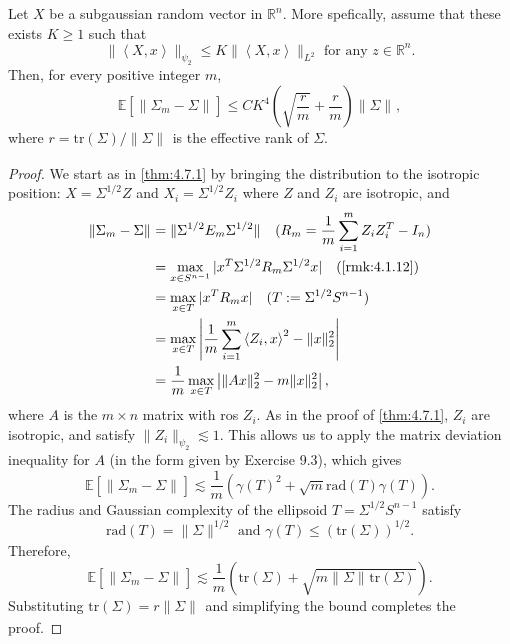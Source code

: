 \begin{theorem}
\label{thm:9.2.2}
Let $X$ be a subgaussian random vector in $\mathbb{R}^n$. More spefically, assume that these exists $K \geq 1$ 
such that 
\[ \lVert \left\langle X, x \right\rangle \rVert_{\psi_2} \leq K \lVert \left\langle X, x 
\right\rangle \rVert_{L^2} \text{ for any } z \in \mathbb{R}^n. \]
Then, for every positive integer $m$, 
\[ \mathbb{E}\left[ \lVert \Sigma_m - \Sigma \rVert_{} \right] \leq CK^4 \left( 
\sqrt{\frac{r}{m}} + \frac{r}{m} \right) \lVert \Sigma \rVert_{}, \]
where $r = \mathrm{tr}(\Sigma)/\lVert \Sigma \rVert_{}$ is the effective rank of $\Sigma$.
\end{theorem}

\begin{proof}
We start as in \cref{thm:4.7.1} by bringing the distribution to the isotropic position: $X = \Sigma^{1/2}Z$ and 
$X_i = \Sigma^{1/2}Z_i$ where $Z$ and $Z_i$ are isotropic, and 
\begin{align*}
	\lVert \Sigma_m - \Sigma \rVert_{} 
	&= \lVert \Sigma^{1/2} E_m \Sigma^{1/2} \rVert_{} \quad (R_m = \frac{1}{m}\sum_{i = 1}^{m}Z_iZ_i^T - I_n) \\
	&= \max_{x \in S^{n-1}} |x^T \Sigma^{1/2} R_m \Sigma^{1/2} x| \quad \text{(\cref{rmk:4.1.12})} \\
	&= \max_{x \in T}|x^T R_m x| \quad (T := \Sigma^{1/2}S^{n-1}) \\
	&= \max_{x \in T} \left| \frac{1}{m}\sum_{i = 1}^{m}\left\langle Z_i, x \right\rangle^2 - 
	\lVert x \rVert_{2}^2 \right| \\
	&= \frac{1}{m}\max_{x \in T} \left| \lVert Ax \rVert_{2}^2 - m \lVert x \rVert_{2}^2 \right|,
\end{align*}
where $A$ is the $m \times n$ matrix with ros $Z_i$. As in the proof of \cref{thm:4.7.1}, $Z_i$ are isotropic, 
and satisfy $\lVert Z_i \rVert_{\psi_2} \lesssim 1$. This allows us to apply the matrix deviation inequality 
for $A$ (in the form given by Exercise 9.3), which gives
\[ \mathbb{E}\left[ \lVert \Sigma_m - \Sigma \rVert_{} \right] \lesssim 
\frac{1}{m}(\gamma(T)^2 + \sqrt{m}\mathrm{rad}(T)\gamma(T)). \]
The radius and Gaussian complexity of the ellipsoid $T = \Sigma^{1/2}S^{n-1}$ satisfy 
\[ \mathrm{rad}(T) = \lVert \Sigma \rVert_{}^{1/2} \text{ and } \gamma(T) \leq (\mathrm{tr}(\Sigma))^{1/2}. \]
Therefore, 
\[ \mathbb{E}\left[ \lVert \Sigma_m - \Sigma \rVert_{} \right] \lesssim 
\frac{1}{m} (\mathrm{tr}(\Sigma) + \sqrt{m \lVert \Sigma \rVert_{} \mathrm{tr}(\Sigma)}). \]
Substituting $\mathrm{tr}(\Sigma) = r \lVert \Sigma \rVert_{}$ and simplifying the bound completes the proof.
\end{proof}

